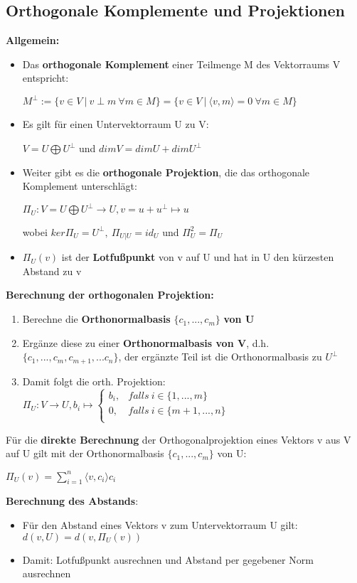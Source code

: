 \documentclass[10pt,a4paper]{article}
\begin{document}
	\subsection{Orthogonale Komplemente und Projektionen}
	\textbf{Allgemein:}
	\begin{itemize}
		\item Das \textbf{orthogonale Komplement} einer Teilmenge M des Vektorraums V entspricht:
		\begin{center}
			$M^\perp := \{v \in V\ |\ v\perp m\ \forall m\in M\} = \{v\in V\ |\ \langle v, m\rangle = 0\ \forall m\in M\}$
		\end{center}
		\item Es gilt für einen Untervektorraum U zu V:
		\begin{center}
			$V = U \bigoplus U^\perp$ und $dim V = dim U + dim U^\perp$
		\end{center}
		\item Weiter gibt es die \textbf{orthogonale Projektion}, die das orthogonale Komplement unterschlägt:
		\begin{center}
			$\Pi_U: V = U \bigoplus U^\perp \rightarrow U, v = u + u^\perp \mapsto u$
		\end{center}
		wobei $ker \Pi_U = U^\perp,\ \Pi_{U|U} = id_U$ und $\Pi^2_U = \Pi_U$
		\item $\Pi_U(v)$ ist der \textbf{Lotfußpunkt} von v auf U und hat in U den kürzesten Abstand zu v
	\end{itemize}
	\textbf{Berechnung der orthogonalen Projektion:}
	\begin{enumerate}
		\item Berechne die \textbf{Orthonormalbasis} $\{c_1, ..., c_m\}$ \textbf{von U}
		\item Ergänze diese zu einer \textbf{Orthonormalbasis von V}, d.h. $\{c_1, ..., c_m, c_{m + 1}, ... c_n\}$, der ergänzte Teil ist die Orthonormalbasis zu $U^\perp$
		\item Damit folgt die orth. Projektion: $\Pi_U: V \rightarrow U, b_i \mapsto
		\begin{cases}
			b_i,& falls\ i \in \{1, ..., m\}\\
			0,& falls\ i \in \{m + 1, ..., n\}\\
		\end{cases}$
	\end{enumerate}
	Für die \textbf{direkte Berechnung} der Orthogonalprojektion eines Vektors v aus V auf U gilt mit der Orthonormalbasis $\{c_1, ..., c_m\}$ von U:
	\begin{center}
		$\Pi_U(v) = \sum_{i = 1}^{n} \langle v, c_i \rangle c_i$
	\end{center}
	\textbf{Berechnung des Abstands}:
	\begin{itemize}
		\item Für den Abstand eines Vektors v zum Untervektorraum U gilt: $d(v, U) = d(v, \Pi_U(v))$
		\item Damit: Lotfußpunkt ausrechnen und Abstand per gegebener Norm ausrechnen
	\end{itemize}
\end{document}
